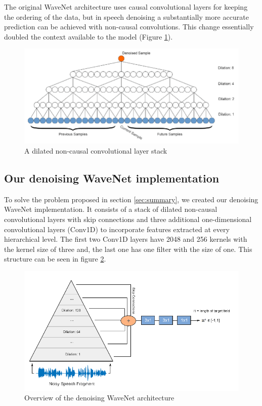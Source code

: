\documentclass{article}
\begin{document}
	The original WaveNet architecture uses causal convolutional layers for keeping the ordering of the data, but in speech denoising a substantially more accurate prediction can be achieved with non-causal convolutions. This change essentially doubled the context available to the model (Figure \ref{fig:dnccs}).
	
	
	\begin{figure}[H]
		\centering
		\includegraphics[width=.9\linewidth]{dnccs.png}
		\caption{A dilated non-causal convolutional layer stack}
		\label{fig:dnccs}
	\end{figure}
	
	
	\subsection{Our denoising WaveNet implementation}
	\label{sec:own_wavenet}
	To solve the problem proposed in section \ref{sec:summary}, we created our denoising WaveNet implementation. It consists of a stack of dilated non-causal convolutional layers with skip connections and three additional one-dimensional convolutional layers (Conv1D) to incorporate features extracted at every hierarchical level. The first two Conv1D layers have 2048 and 256 kernels with the kernel size of three and, the last one has one filter with the size of one. This structure can be seen in figure \ref{fig:own_wavenet}.
	\begin{figure}[H]
		\centering
		\includegraphics[width=.9\linewidth]{own_wavenet.png}
		\caption{Overview of the denoising WaveNet architecture}
		\label{fig:own_wavenet}
	\end{figure}
	
\end{document}
